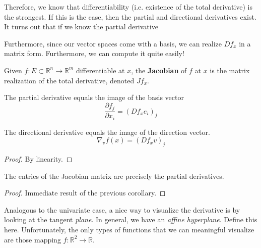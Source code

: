   Therefore, we know that differentiability (i.e. existence of the total derivative) is the strongest. If this is the case, then the partial and directional derivatives exist. It turns out that if we know the partial derivative 

  Furthermore, since our vector spaces come with a basis, we can realize $Df_x$ in a matrix form. Furthermore, we can compute it quite easily!

  \begin{definition}[Jacobian]
    Given $f: E \subset \mathbb{R}^n \to \mathbb{R}^m$ differentiable at $x$, the \textbf{Jacobian} of $f$ at $x$ is the matrix realization of the total derivative, denoted $J f_x$. 
  \end{definition} 

  \begin{theorem}
    The partial derivative equals the image of the basis vector 
    \begin{equation}
      \frac{\partial f_j}{\partial x_i} = (D f_x e_i)_j
    \end{equation}
  \end{theorem}
  
  \begin{corollary}
    The directional derivative equals the image of the direction vector. 
    \begin{equation}
      \nabla_v f(x) = (D f_x v)_j
    \end{equation}
  \end{corollary}
  \begin{proof}
    By linearity. 
  \end{proof}

  \begin{corollary}
    The entries of the Jacobian matrix are precisely the partial derivatives. 
  \end{corollary}
  \begin{proof}
    Immediate result of the previous corollary. 
  \end{proof}

  Analogous to the univariate case, a nice way to visualize the derivative is by looking at the tangent \textit{plane}. In general, we have an \textit{affine hyperplane}. Define this here. Unfortunately, the only types of functions that we can meaningful visualize are those mapping $f: \mathbb{R}^2 \to \mathbb{R}$. 

